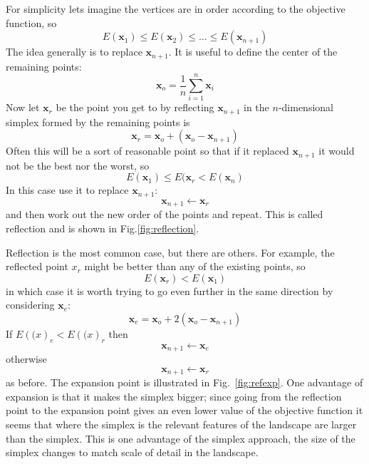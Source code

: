 \documentclass[11pt,a4paper]{scrartcl}
\begin{document}
For simplicity lets imagine the vertices are in order according to the
objective function, so
\begin{equation}
E(\mathbf{x}_1)\le E(\mathbf{x}_2)\le \ldots \le E(\mathbf{x}_{n+1})
\end{equation}
The idea generally is to replace $\mathbf{x}_{n+1}$. It is useful to
define the center of the remaining points:
\begin{equation}
\mathbf{x}_o=\frac{1}{n}\sum_{i=1}^n\mathbf{x}_i
\end{equation}
Now let $\mathbf{x}_r$ be the point you get to by reflecting
$\mathbf{x}_{n+1}$ in the $n$-dimensional simplex formed by the
remaining points is
\begin{equation}
\mathbf{x}_r=\mathbf{x}_o+(\mathbf{x}_o-\mathbf{x}_{n+1})
\end{equation}
Often this will be a sort of reasonable point so that if it replaced $\mathbf{x}_{n+1}$ it would not be the best nor the worst, so
\begin{equation}
E(\mathbf{x}_1)\le E(\mathbf{x}_r < E(\mathbf{x}_n)
\end{equation}
In this case use it to replace $\mathbf{x}_{n+1}$:
\begin{equation}
\mathbf{x}_{n+1}\leftarrow \mathbf{x}_r
\end{equation}
and then work out the new order of the points and repeat. This is called reflection and is shown in Fig.\ref{fig:reflection}.

Reflection is the most common case, but there are others. For example,
the reflected point $x_r$ might be better than any of the existing
points, so
\begin{equation}
E(\mathbf{x}_r)<E(\mathbf{x}_1)
\end{equation}
in which case it is worth trying to go even further in the same direction by considering $\mathbf{x}_e$:
\begin{equation}
\mathbf{x}_e=\mathbf{x}_o+2(\mathbf{x}_o-\mathbf{x}_{n+1})
\end{equation}
If $E(\mathbf(x)_e<E(\mathbf(x)_r$ then
\begin{equation}
\mathbf{x}_{n+1}\leftarrow \mathbf{x}_e
\end{equation}
otherwise
\begin{equation}
\mathbf{x}_{n+1}\leftarrow \mathbf{x}_r
\end{equation}
as before. The expansion point is illustrated in
Fig.~\ref{fig:refexp}. One advantage of expansion is that it makes the
simplex bigger; since going from the reflection point to the expansion
point gives an even lower value of the objective function it seems
that where the simplex is the relevant features of the landscape are
larger than the simplex. This is one advantage of the simplex
approach, the size of the simplex changes to match scale of detail in
the landscape.
\end{document}
